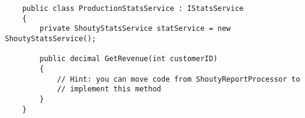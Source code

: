 \begin{verbatim}
    public class ProductionStatsService : IStatsService
    {
        private ShoutyStatsService statService = new ShoutyStatsService();
    
        public decimal GetRevenue(int customerID)
        {
            // Hint: you can move code from ShoutyReportProcessor to 
            // implement this method
        }
    }    
\end{verbatim}
